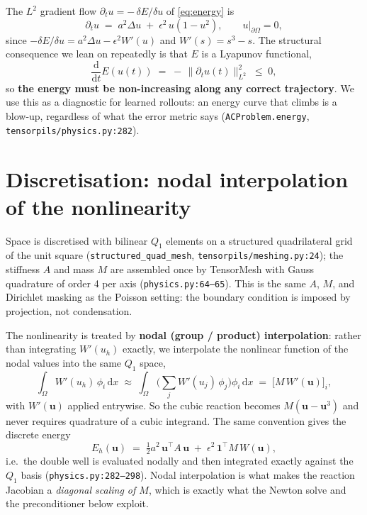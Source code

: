 \documentclass[11pt]{article}
\newcommand{\uh}{u_h}
\begin{document}
The $L^2$ gradient flow $\partial_t u = -\,\delta E/\delta u$ of \eqref{eq:energy} is
\begin{equation}\label{eq:ac-pde}
   \partial_t u \;=\; a^2\Delta u \;+\; \epsilon^2\,u(1-u^2),
   \qquad u|_{\partial\Omega}=0,
\end{equation}
since $-\delta E/\delta u = a^2\Delta u - \epsilon^2 W'(u)$ and $W'(s)=s^3-s$. The structural
consequence we lean on repeatedly is that $E$ is a Lyapunov functional,
\begin{equation}\label{eq:dissipation}
   \frac{\mathrm d}{\mathrm dt}E(u(t)) \;=\; -\,\|\partial_t u(t)\|_{L^2}^2 \;\le\; 0 ,
\end{equation}
so \textbf{the energy must be non-increasing along any correct trajectory}. We use this as a
diagnostic for learned rollouts: an energy curve that climbs is a blow-up, regardless of what the
error metric says (\texttt{ACProblem.energy}, \texttt{tensorpils/physics.py:282}).

\section{Discretisation: nodal interpolation of the nonlinearity}

Space is discretised with bilinear $Q_1$ elements on a structured quadrilateral grid of the unit
square (\texttt{structured\_quad\_mesh}, \texttt{tensorpils/meshing.py:24}); the stiffness $A$ and
mass $M$ are assembled once by TensorMesh with Gauss quadrature of order 4 per axis
(\texttt{physics.py:64--65}). This is the same $A$, $M$, and Dirichlet masking as the Poisson
setting: the boundary condition is imposed by projection, not condensation.

The nonlinearity is treated by \textbf{nodal (group / product) interpolation}: rather than
integrating $W'(\uh)$ exactly, we interpolate the nonlinear function of the nodal values into the
same $Q_1$ space,
\begin{equation}\label{eq:group-fem}
   \int_\Omega W'(\uh)\,\phi_i\,\mathrm dx
   \;\approx\;
   \int_\Omega \Big(\textstyle\sum_j W'(u_j)\,\phi_j\Big)\phi_i\,\mathrm dx
   \;=\;\big[M\,W'(\mathbf u)\big]_i ,
\end{equation}
with $W'(\mathbf u)$ applied entrywise. So the cubic reaction becomes $M(\mathbf u-\mathbf u^3)$
and never requires quadrature of a cubic integrand. The same convention gives the discrete energy
\begin{equation}\label{eq:discrete-energy}
   E_h(\mathbf u) \;=\; \tfrac12 a^2\,\mathbf u^\top A\,\mathbf u
   \;+\; \epsilon^2\,\mathbf 1^\top M\,W(\mathbf u),
\end{equation}
i.e.\ the double well is evaluated nodally and then integrated exactly against the $Q_1$ basis
(\texttt{physics.py:282--298}). Nodal interpolation is what makes the reaction Jacobian a
\emph{diagonal scaling of $M$}, which is exactly what the Newton solve and the preconditioner
below exploit.
\end{document}
